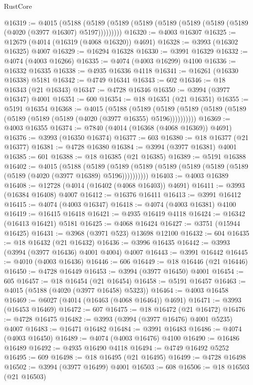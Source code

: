 \begin{lexlean}{RustCore}
\begin{coremodule}
@16319 := @4015
    (@5188 (@5189 (@5189 (@5189 (@5189 (@5189 (@5189 (@5189 (@4020 (@3977 @16307) @5197)))))))))
@16320 := @4003 @16307
@16325 := @12679 (@4014 (@16319 (@4068 @16320)) @4691)
@16328 := @3993 (@16302 @16325) @4007
@16329 := @16294 @16328
@16330 := @3991 @16329
@16332 := @4074 (@4003 @16266)
@16335 := @4074 (@4003 @16299) @4100
@16336 := @16332 @16335
@16338 := @4935 @16336 @4118
@16341 := @16261 (@16330 @16338) @5181
@16342 := @4749 @16341
@16343 := 602
@16346 := @18 @16343 (@21 @16343)
@16347 := @4728 @16346
@16350 := @3994 (@3977 @16347) @4001
@16351 := 600
@16354 := @18 @16351 (@21 @16351)
@16355 := @5191 @16354
@16368 := @4015
    (@5188
      (@5189 (@5189 (@5189 (@5189 (@5189 (@5189 (@5189 (@5189 (@4020 (@3977 @16355) @5196))))))))))
@16369 := @4003 @16355
@16374 := @7840 (@4014 (@16368 (@4068 @16369)) @4691)
@16376 := @3993 (@16350 @16374)
@16377 := 603
@16380 := @18 @16377 (@21 @16377)
@16381 := @4728 @16380
@16384 := @3994 (@3977 @16381) @4001
@16385 := 601
@16388 := @18 @16385 (@21 @16385)
@16389 := @5191 @16388
@16402 := @4015
    (@5188
      (@5189 (@5189 (@5189 (@5189 (@5189 (@5189 (@5189 (@5189 (@4020 (@3977 @16389) @5196))))))))))
@16403 := @4003 @16389
@16408 := @12728 (@4014 (@16402 (@4068 @16403)) @4691)
@16411 := @3993 (@16384 @16408) @4007
@16412 := @16376 @16411
@16413 := @3991 @16412
@16415 := @4074 (@4003 @16347)
@16418 := @4074 (@4003 @16381) @4100
@16419 := @16415 @16418
@16421 := @4935 @16419 @4118
@16424 := @16342 (@16413 @16421) @5181
@16425 := @4068 @16424
@16427 := @3751 (@15944 @16425)
@16431 := @3968 (@3971 @523) @13698 @12100
@16432 := 604
@16435 := @18 @16432 (@21 @16432)
@16436 := @3996 @16435
@16442 := @3993 (@3994 (@3977 @16436) @4001 @4004) @4007
@16443 := @3991 @16442
@16445 := @4010 (@4003 @16436)
@16446 := 606
@16449 := @18 @16446 (@21 @16446)
@16450 := @4728 @16449
@16453 := @3994 (@3977 @16450) @4001
@16454 := 605
@16457 := @18 @16454 (@21 @16454)
@16458 := @5191 @16457
@16463 := @4015 (@5188 (@4020 (@3977 @16458) @5323))
@16464 := @4003 @16458
@16469 := @6027 (@4014 (@16463 (@4068 @16464)) @4691)
@16471 := @3993 (@16453 @16469)
@16472 := 607
@16475 := @18 @16472 (@21 @16472)
@16476 := @4728 @16475
@16482 := @3993 (@3994 (@3977 @16476) @4001 @5235) @4007
@16483 := @16471 @16482
@16484 := @3991 @16483
@16486 := @4074 (@4003 @16450)
@16489 := @4074 (@4003 @16476) @4100
@16490 := @16486 @16489
@16492 := @4935 @16490 @4118
@16494 := @4749 @16492 @5252
@16495 := 609
@16498 := @18 @16495 (@21 @16495)
@16499 := @4728 @16498
@16502 := @3994 (@3977 @16499) @4001
@16503 := 608
@16506 := @18 @16503 (@21 @16503)

\end{coremodule}
\end{lexlean}
